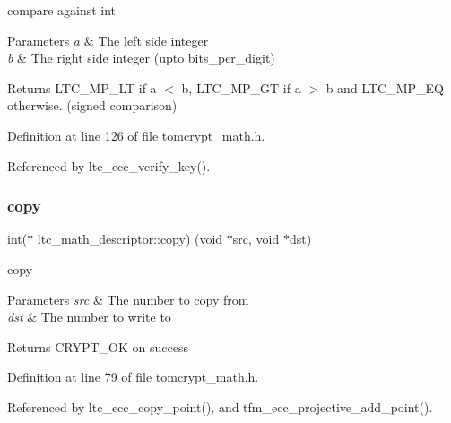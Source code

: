 compare against int 


\begin{DoxyParams}{Parameters}
{\em a} & The left side integer \\
\hline
{\em b} & The right side integer (upto bits\+\_\+per\+\_\+digit) \\
\hline
\end{DoxyParams}
\begin{DoxyReturn}{Returns}
L\+T\+C\+\_\+\+M\+P\+\_\+\+LT if a $<$ b, L\+T\+C\+\_\+\+M\+P\+\_\+\+GT if a $>$ b and L\+T\+C\+\_\+\+M\+P\+\_\+\+EQ otherwise. (signed comparison) 
\end{DoxyReturn}


Definition at line 126 of file tomcrypt\+\_\+math.\+h.



Referenced by ltc\+\_\+ecc\+\_\+verify\+\_\+key().

\mbox{\label{structltc__math__descriptor_a1f4a910f2a962c70c7ef7dae0bc84eef}} 
\subsubsection{\texorpdfstring{copy}{copy}}
{\footnotesize\ttfamily int($\ast$ ltc\+\_\+math\+\_\+descriptor\+::copy) (void $\ast$src, void $\ast$dst)}



copy 


\begin{DoxyParams}{Parameters}
{\em src} & The number to copy from \\
\hline
{\em dst} & The number to write to \\
\hline
\end{DoxyParams}
\begin{DoxyReturn}{Returns}
C\+R\+Y\+P\+T\+\_\+\+OK on success 
\end{DoxyReturn}


Definition at line 79 of file tomcrypt\+\_\+math.\+h.



Referenced by ltc\+\_\+ecc\+\_\+copy\+\_\+point(), and tfm\+\_\+ecc\+\_\+projective\+\_\+add\+\_\+point().

\mbox{\label{structltc__math__descriptor_a8397a978088c5d65413a3d110e9d163f}} 
